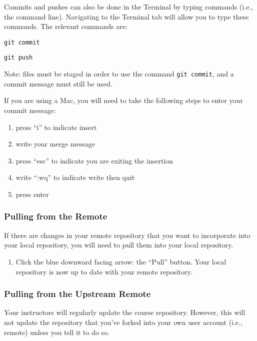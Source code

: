 \documentclass[
]{article}
\providecommand{\tightlist}{%
  \setlength{\itemsep}{0pt}\setlength{\parskip}{0pt}}
\begin{document}
Commits and pushes can also be done in the Terminal by typing commands
(i.e., the command line). Navigating to the Terminal tab will allow you
to type these commands. The relevant commands are:

\texttt{git\ commit}

\texttt{git\ push}

Note: files must be staged in order to use the command
\texttt{git\ commit}, and a commit message must still be used.

If you are using a Mac, you will need to take the following steps to
enter your commit message:

\begin{enumerate}
\def\labelenumi{\arabic{enumi}.}
\item
  press ``i'' to indicate insert
\item
  write your merge message
\item
  press ``esc'' to indicate you are exiting the insertion
\item
  write ``:wq'' to indicate write then quit
\item
  press enter
\end{enumerate}

\hypertarget{pulling-from-the-remote}{%
\subsubsection{Pulling from the Remote}\label{pulling-from-the-remote}}

If there are changes in your remote repository that you want to
incorporate into your local repository, you will need to pull them into
your local repository.

\begin{enumerate}
\def\labelenumi{\arabic{enumi}.}
\tightlist
\item
  Click the blue downward facing arrow: the ``Pull'' button. Your local
  repository is now up to date with your remote repository.
\end{enumerate}

\hypertarget{pulling-from-the-upstream-remote}{%
\subsubsection{Pulling from the Upstream
Remote}\label{pulling-from-the-upstream-remote}}

Your instructors will regularly update the course repository. However,
this will not update the repository that you've forked into your own
user account (i.e., remote) unless you tell it to do so.
\end{document}
